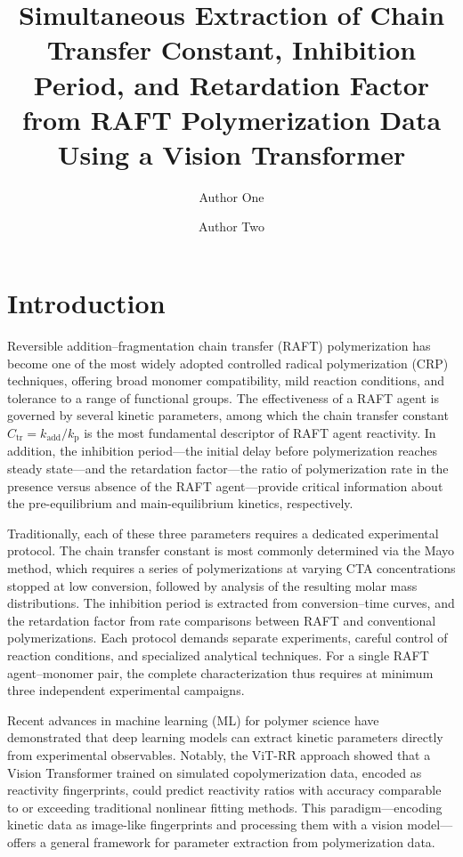 \documentclass[journal=mamobx,manuscript=article]{achemso}
\author{Author One}
\affiliation{Department of Chemistry, University, City, Country}
\author{Author Two}
\affiliation{Department of Chemistry, University, City, Country}
\title{Simultaneous Extraction of Chain Transfer Constant, Inhibition Period, and Retardation Factor from RAFT Polymerization Data Using a Vision Transformer}
\begin{document}
\section{Introduction}

Reversible addition--fragmentation chain transfer (RAFT) polymerization\cite{Moad2005,Keddie2012} has become one of the most widely adopted controlled radical polymerization (CRP) techniques, offering broad monomer compatibility, mild reaction conditions, and tolerance to a range of functional groups. The effectiveness of a RAFT agent is governed by several kinetic parameters, among which the chain transfer constant $C_\mathrm{tr} = k_\mathrm{add}/k_\mathrm{p}$ is the most fundamental descriptor of RAFT agent reactivity.\cite{Chong2003} In addition, the inhibition period---the initial delay before polymerization reaches steady state---and the retardation factor---the ratio of polymerization rate in the presence versus absence of the RAFT agent---provide critical information about the pre-equilibrium and main-equilibrium kinetics, respectively.\cite{BarnerKowollik2006,Feldermann2005}

Traditionally, each of these three parameters requires a dedicated experimental protocol. The chain transfer constant is most commonly determined via the Mayo method,\cite{Mayo1943} which requires a series of polymerizations at varying CTA concentrations stopped at low conversion, followed by analysis of the resulting molar mass distributions. The inhibition period is extracted from conversion--time curves, and the retardation factor from rate comparisons between RAFT and conventional polymerizations.\cite{Moad2011} Each protocol demands separate experiments, careful control of reaction conditions, and specialized analytical techniques. For a single RAFT agent--monomer pair, the complete characterization thus requires at minimum three independent experimental campaigns.

Recent advances in machine learning (ML) for polymer science have demonstrated that deep learning models can extract kinetic parameters directly from experimental observables. Notably, the ViT-RR approach\cite{ViTRR2025} showed that a Vision Transformer trained on simulated copolymerization data, encoded as reactivity fingerprints, could predict reactivity ratios with accuracy comparable to or exceeding traditional nonlinear fitting methods. This paradigm---encoding kinetic data as image-like fingerprints and processing them with a vision model---offers a general framework for parameter extraction from polymerization data.
\end{document}
